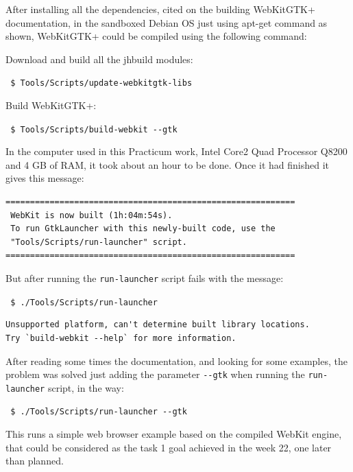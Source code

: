 \documentclass[a4paper,11pt,openany]{report}
\begin{document}
After installing all the dependencies, cited on the building WebKitGTK+ documentation, in the sandboxed Debian OS just using apt-get command as shown, WebKitGTK+ could be compiled using the following command:

Download and build all the jhbuild modules:

\verb# $ Tools/Scripts/update-webkitgtk-libs #

Build WebKitGTK+:

\verb# $ Tools/Scripts/build-webkit --gtk #

In the computer used in this Practicum work, Intel{\textregistered} Core{\texttrademark}2 Quad Processor Q8200 and 4 GB of RAM, it took about an hour to be done. Once it had finished it gives this message:

{
\footnotesize
\begin{lstlisting}
===========================================================
 WebKit is now built (1h:04m:54s).
 To run GtkLauncher with this newly-built code, use the
 "Tools/Scripts/run-launcher" script.
===========================================================
\end{lstlisting}
}

But after running the \verb#run-launcher# script fails with the message:

\verb# $ ./Tools/Scripts/run-launcher #

{
\footnotesize
\begin{lstlisting}
Unsupported platform, can't determine built library locations.
Try `build-webkit --help` for more information.
\end{lstlisting}
}

After reading some times the documentation, and looking for some examples, the problem was solved just adding the parameter \verb#--gtk# when running the \verb#run-launcher# script, in the way:

\verb# $ ./Tools/Scripts/run-launcher --gtk #

This runs a simple web browser example based on the compiled WebKit engine, that could be considered as the task 1 goal achieved in the week 22, one later than planned.
\end{document}

